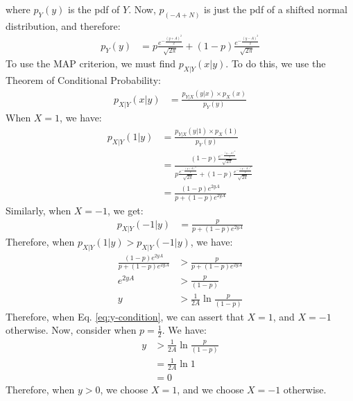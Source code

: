 \documentclass[journal,12pt,twocolumn]{IEEEtran}
\renewcommand\thesection{\arabic{section}}
\begin{document}
\begin{enumerate}[label=\thesection.\arabic*
,ref=\thesection.\theenumi]
\begin{enumerate}[label=\thesection.\arabic*
,ref=\thesection.\theenumi]
where $p_Y(y)$ is the pdf of $Y$. Now, $p_{(-A + N)}$ is just the pdf of a shifted
normal distribution, and therefore:
\begin{align}
    p_Y(y) &=  p \frac{e^{-\frac{(y+A)^2}{2}}}{\sqrt{2\pi}} + \left(1-p\right) \frac{e^{-\frac{(y-A)^2}{2}}}{\sqrt{2\pi}}
\end{align}
To use the MAP criterion, we must find $p_{X|Y}(x|y)$. To do this, we use the Theorem of Conditional Probability:
\begin{align}
    p_{X|Y}(x|y) &= \frac{p_{Y|X}(y|x) \times p_X(x)}{p_Y(y)}
\end{align}
When $X=1$, we have:
\begin{align}
    p_{X|Y}(1|y) &= \frac{p_{Y|X}(y|1) \times p_X(1)}{p_Y(y)} \\
    &= \frac{\left(1-p\right) \frac{e^{-\frac{(y-A)^2}{2}}}{\sqrt{2\pi}}}{ p \frac{e^{-\frac{(y+A)^2}{2}}}{\sqrt{2\pi}} + \left(1-p\right) \frac{e^{-\frac{(y-A)^2}{2}}}{\sqrt{2\pi}}} \\
    &= \frac{\left(1-p\right) e^{2yA}}{p + \left(1-p\right) e^{2yA}}
\end{align}
Similarly, when $X = -1$, we get:
\begin{align}
    p_{X|Y}(-1|y) &= \frac{p}{p + \left(1-p\right) e^{2yA}} 
\end{align}
Therefore, when $ p_{X|Y}(1|y) >  p_{X|Y}(-1|y)$, we have:
\begin{align}
    \frac{\left(1-p\right) e^{2yA}}{p + \left(1-p\right) e^{2yA}} &> \frac{p}{p + \left(1-p\right) e^{2yA}} \\
    e^{2yA} &> \frac{p}{\left(1-p\right)} \\
    \label{eq:y-condition}
    y &> \frac{1}{2A} \ln{\frac{p}{\left(1-p\right)}}
\end{align}
Therefore, when Eq. \eqref{eq:y-condition}, we can assert that $X = 1$, and $X = -1$ otherwise.
Now, consider when $p = \frac{1}{2} $.
We have:
\begin{align}
    y &> \frac{1}{2A} \ln{\frac{p}{\left(1-p\right)}} \\
    &= \frac{1}{2A} \ln{1} \\
    &= 0
\end{align}
Therefore, when $y > 0$, we choose $X = 1$, and we choose $X = -1$ otherwise.


		\end{enumerate}

\end{enumerate}
\end{document}
